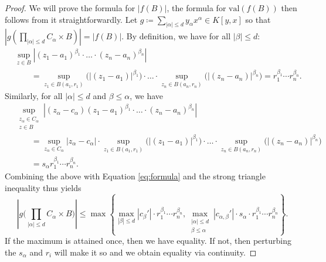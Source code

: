 \documentclass[10pt,a4paper]{amsart}
\newcommand{\val}{{\mathrm{val}}}
\begin{document}
\begin{proof}
  We will prove the formula for $|f(B)|$, the formula for $\val(f(B))$ then follows from it straightforwardly.
  Let $g\coloneqq \sum_{|\alpha|\leq d} y_\alpha x^\alpha\in K[y,x]$ so that $|g(\prod_{|\alpha|\leq d}C_\alpha\times B)|=|f(B)|$.  By definition, we have for all $|\beta|\leq d$:
  \begin{align*}
    &\sup_{z\in B}|(z_1-a_1)^{\beta_1}\cdot\ldots\cdot (z_n-a_n)^{\beta_n}|\\
    &\qquad = \sup_{z_1\in B(a_1,r_1)}\Big(|(z_1-a_1)|^{\beta_1}\Big) \cdot\ldots\cdot \sup_{z_n\in B(a_n,r_n)}\Big(|(z_n-a_n)|^{\beta_n}\Big)
    = r_1^{\beta_1}\cdots r_n^{\beta_n}.
  \end{align*}
  Similarly, for all $|\alpha|\leq d$ and $\beta\leq\alpha$, we have
  \begin{align*}
    &\sup_{\substack{z_\alpha\in C_\alpha\\ z\in B}} |(z_\alpha-c_\alpha)(z_1-a_1)^{\beta_1}\cdot\ldots\cdot (z_n-a_n)^{\beta_n}|\\
    &\qquad = \sup_{z_\alpha\in C_\alpha} |z_\alpha-c_\alpha| \cdot \sup_{z_1\in B(a_1,r_1)}\Big(|(z_1-a_1)|^{\beta_1}\Big) \cdot\ldots\cdot \sup_{z_n\in B(a_n,r_n)}\Big(|(z_n-a_n)|^{\beta_n}\Big)\\
    &\qquad = s_\alpha r_1^{\beta_1}\cdots r_n^{\beta_n}.
  \end{align*}
  Combining the above with Equation \eqref{eq:formula} and the strong triangle inequality thus yields
  \begin{equation*}
    \left|g\Big(\prod_{|\alpha|\leq d}C_\alpha\times B\Big)\right|\leq
    \max\left\{
      \max_{|\beta|\leq d}|c_\beta'|\cdot r_1^{\beta_1}\cdots r_n^{\beta_n},
      \max_{\substack{|\alpha|\leq d\\ \beta \le \alpha}} |c_{\alpha,\beta}'|\cdot s_\alpha\cdot r_1^{\beta_1}\cdots r_n^{\beta_n}
    \right\}.
  \end{equation*}
  If the maximum is attained once, then we have equality.  If not, then perturbing the $s_\alpha$ and $r_i$ will make it so and we obtain equality via continuity.
\end{proof}
\end{document}

